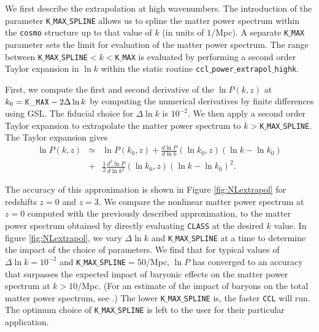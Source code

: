 \documentclass[\docopts]{\docclass}
\newcommand{\ccl}{{\tt CCL}\xspace}
\begin{document}
We first describe the extrapolation at high wavenumbers. The introduction of the parameter {\tt K$\_$MAX$\_$SPLINE} allows us to spline the matter power spectrum within the {\tt cosmo} structure up to that value of $k$ (in units of $1/$Mpc). A separate {\tt K$\_$MAX} parameter sets the limit for evaluation of the matter power spectrum. The range between {\tt K$\_$MAX$\_$SPLINE}$<k<${\tt K$\_$MAX} is evaluated by performing a second order Taylor expansion in $\ln k$ within the static routine {\tt ccl$\_$power$\_$extrapol$\_$highk}. 

First, we compute the first and second derivative of the $\ln P(k,z)$ at $k_0={\rm \tt K\_MAX}-2\Delta\ln k$ by computing the numerical derivatives by finite differences using GSL. The fiducial choice for $\Delta\ln k$ is $10^{-2}$. We then apply a second order Taylor expansion to extrapolate the matter power spectrum to $k>${\tt K$\_$MAX$\_$SPLINE}. The Taylor expansion gives
%
\begin{eqnarray}
  \ln P(k,z) &\simeq& \ln P(k_0,z) + \frac{d\ln P}{d\ln k}(\ln k_0,z) (\ln k-\ln k_0)  \nonumber\\
  &+& \frac{1}{2}  \frac{d^2\ln P}{d\ln k^2}(\ln k_0,z) (\ln k-\ln k_0)^2.
  \label{eq:NLPSTaylor}
\end{eqnarray}

The accuracy of this approximation is shown in Figure \ref{fig:NLextrapol} for redshifts $z=0$ and $z=3$. We compare the nonlinear matter power spectrum at $z=0$ computed with the previously described approximation, to the matter power spectrum obtained by directly evaluating {\tt CLASS} at the desired $k$ value. In figure \ref{fig:NLextrapol}, we vary $\Delta \ln k$ and {\tt K$\_$MAX$\_$SPLINE} at a time to determine the impact of the choice of parameters. We find that for typical values of $\Delta \ln k=10^{-2}$ and {\tt K$\_$MAX$\_$SPLINE}$=50$/Mpc, $\ln P$ has converged to an accuracy that surpasses the expected impact of baryonic effects on the matter power spectrum at $k>10/$Mpc.  (For an estimate of the impact of baryons on the total matter power spectrum, see \citealt{Schneider15}.) The lower {\tt K$\_$MAX$\_$SPLINE} is, the faster \ccl will run. The optimum choice of {\tt K$\_$MAX$\_$SPLINE} is left to the user for their particular application. 
\end{document}
